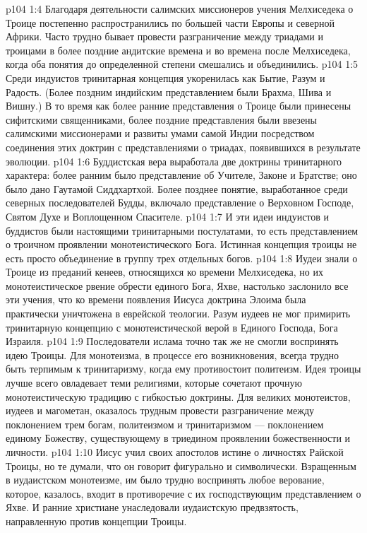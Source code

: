 \vs p104 1:4 Благодаря деятельности салимских миссионеров учения Мелхиседека о Троице постепенно распространились по большей части Европы и северной Африки. Часто трудно бывает провести разграничение между триадами и троицами в более поздние андитские времена и во времена после Мелхиседека, когда оба понятия до определенной степени смешались и объединились.
\vs p104 1:5 \pc Среди индуистов тринитарная концепция укоренилась как Бытие, Разум и Радость. (Более поздним индийским представлением были Брахма, Шива и Вишну.) В то время как более ранние представления о Троице были принесены сифитскими священниками, более поздние представления были ввезены салимскими миссионерами и развиты умами самой Индии посредством соединения этих доктрин с представлениями о триадах, появившихся в результате эволюции.
\vs p104 1:6 Буддистская вера выработала две доктрины тринитарного характера: более ранним было представление об Учителе, Законе и Братстве; оно было дано Гаутамой Сиддхартхой. Более позднее понятие, выработанное среди северных последователей Будды, включало представление о Верховном Господе, Святом Духе и Воплощенном Спасителе.
\vs p104 1:7 И эти идеи индуистов и буддистов были настоящими тринитарными постулатами, то есть представлением о троичном проявлении монотеистического Бога. Истинная концепция троицы не есть просто объединение в группу трех отдельных богов.
\vs p104 1:8 \pc Иудеи знали о Троице из преданий кенеев, относящихся ко времени Мелхиседека, но их монотеистическое рвение обрести единого Бога, Яхве, настолько заслонило все эти учения, что ко времени появления Иисуса доктрина Элоима была практически уничтожена в еврейской теологии. Разум иудеев не мог примирить тринитарную концепцию с монотеистической верой в Единого Господа, Бога Израиля.
\vs p104 1:9 Последователи ислама точно так же не смогли воспринять идею Троицы. Для монотеизма, в процессе его возникновения, всегда трудно быть терпимым к тринитаризму, когда ему противостоит политеизм. Идея троицы лучше всего овладевает теми религиями, которые сочетают прочную монотеистическую традицию с гибкостью доктрины. Для великих монотеистов, иудеев и магометан, оказалось трудным провести разграничение между поклонением трем богам, политеизмом и тринитаризмом --- поклонением единому Божеству, существующему в триедином проявлении божественности и личности.
\vs p104 1:10 \pc Иисус учил своих апостолов истине о личностях Райской Троицы, но те думали, что он говорит фигурально и символически. Взращенным в иудаистском монотеизме, им было трудно воспринять любое верование, которое, казалось, входит в противоречие с их господствующим представлением о Яхве. И ранние христиане унаследовали иудаистскую предвзятость, направленную против концепции Троицы.
